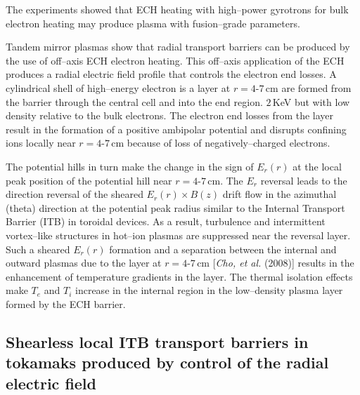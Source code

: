 \documentclass[a4paper,openany,12pt]{report}
\begin{document}
The experiments showed that ECH heating with high--power gyrotrons for bulk electron heating may produce plasma with fusion--grade parameters.

Tandem mirror plasmas show that radial transport barriers can be produced by the use of off--axis ECH electron heating. This off--axis application of the ECH produces a radial electric field profile that controls the electron end losses. A cylindrical shell of high--energy electron is a layer at $r=\mbox{4-7}\,$cm are formed from the barrier through the central cell and into the end region. $2\,$KeV but with low density relative to the bulk electrons. The electron end losses from the layer result in the formation of a positive ambipolar potential and disrupts confining ions locally near $r=\mbox{4-7}\,$cm because of loss of negatively--charged electrons.

The potential hills in turn make the change in the sign of $E_r(r)$ at the local peak position of the potential hill near $r=\mbox{4-7}\,$cm. The $E_r$ reversal leads to the direction reversal of the sheared $E_r(r)\times B(z)$ drift flow in the azimuthal (theta) direction at the potential peak radius similar to the Internal Transport Barrier (ITB) in toroidal devices. As a result, turbulence and intermittent vortex--like structures in hot--ion plasmas are suppressed near the reversal layer. Such a sheared $E_r(r)$ formation and a separation between the internal and outward plasmas due to the layer at $r=\mbox{4-7}\,$cm [\emph{Cho, et al.} (2008)] results in the enhancement of temperature gradients in the layer. The thermal isolation effects make $T_e$ and $T_i$ increase in the internal region in the low--density plasma layer formed by the ECH barrier.

\subsection{Shearless local ITB transport barriers in tokamaks produced by control of the radial electric field}
\end{document}
